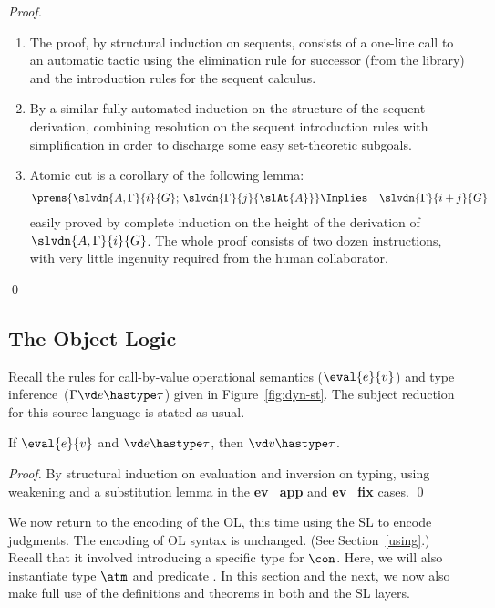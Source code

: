 \documentclass[final]{svjour3}
\begin{document}
\begin{proof}\mbox{}
   \begin{enumerate}
   \item The proof, by structural induction on sequents, consists of
     a one-line call to  an automatic tactic using
     the elimination rule for successor (from the \HOL library) and
     the introduction rules for the sequent calculus.  
   \item By a similar fully automated induction on the structure of
     the sequent derivation,  combining 
      resolution on the sequent introduction rules with simplification
   in order to discharge some easy
     set-theoretic subgoals.
   \item Atomic cut is a corollary of the following lemma:
     \begin{eqnarray*}
       \prems{\slvdn{A,\Gamma}{i}{G};\,
         \slvdn{\Gamma}{j}{\slAt{A}}}& \Implies& \slvdn{\Gamma}{i+j}{G} 
     \end{eqnarray*}
easily proved by complete induction on the height of the derivation
of $\slvdn{A,\Gamma}{i}{G}$.  
The whole proof consists of two dozen instructions, with very little
ingenuity required from the human collaborator. 


   \end{enumerate}
\qed\end{proof}



\subsection{The Object Logic}
\label{ssec:prog}


Recall the rules for call-by-value operational semantics
($\eval{e}{v}$) and type inference\ ($\Gamma \vd e \hastype \tau$)
given in Figure~\ref{fig:dyn-st}.  The  subject reduction for
this source language is stated as usual.
\begin{thm}
\label{thm:infsubred}  
If $\eval{e}{v}$ and $\vd e\hastype\tau$, then $\vd
v\hastype\tau$.
\end{thm}
\begin{proof}
  By structural induction on evaluation and inversion on typing, using
  weakening and a substitution lemma in the \textbf{ev\_app} and
  \textbf{ev\_fix} cases.
\qed\end{proof}


We now return to the encoding of the OL, this time using the SL to
encode judgments.  The encoding of OL syntax is unchanged.  (See
Section~\ref{using}.)  Recall that it involved introducing a specific
type for $\con$.  Here, we will also instantiate type $\atm$ and
predicate .  In this section and the next, we now also
make full use of the definitions and theorems in both \hybrid and the
SL layers.
\end{document}
